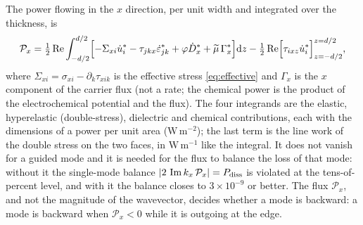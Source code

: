 The power flowing in the $x$ direction, per unit width and integrated over the
thickness, is
\begin{equation}
\label{eq:Px_int}
\mathcal{P}_x=\tfrac12\operatorname{Re}\int_{-d/2}^{d/2}
\Bigl[-\Sigma_{xi}\dot u_i^{*}-\tau_{jkx}\dot\varepsilon_{jk}^{*}
+\varphi\dot D_x^{*}+\widetilde\mu\,\Gamma_x^{*}\Bigr]\mathrm{d} z
-\tfrac12\operatorname{Re}\Bigl[\tau_{ixz}\dot u_i^{*}\Bigr]_{z=-d/2}^{z=d/2} ,
\end{equation}
where $\Sigma_{xi}=\sigma_{xi}-\partial_k\tau_{xik}$ is the effective stress \eqref{eq:effective} and $\Gamma_x$ is the $x$ component of the carrier flux (not a rate; the
chemical power is the product of the electrochemical potential and the flux).  The four
integrands are the elastic, hyperelastic (double-stress), dielectric and chemical
contributions, each with the dimensions of a power per unit area
($\mathrm{W\,m^{-2}}$); the last term is the line work of the double stress on the two
faces, in $\mathrm{W\,m^{-1}}$ like the integral.  It does not vanish for a guided mode and
it is needed for the flux to balance the loss of that mode: without it the
single-mode balance $\lvert2\,\operatorname{Im} k_x\,\mathcal P_x\rvert=P_{\text{diss}}$ is violated at the
tens-of-percent level, and with it the balance closes to $3\times10^{-9}$ or better.  The flux
$\mathcal P_x$, and not the magnitude of the wavevector, decides whether a mode
is backward: a mode is backward when $\mathcal{P}_x<0$ while it is outgoing at
the edge.

